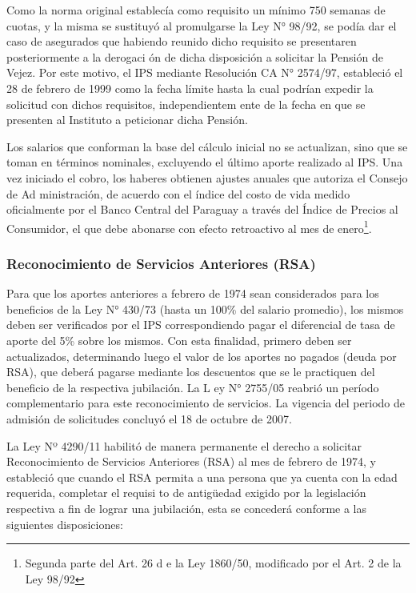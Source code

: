 Como la norma original establecía como requisito un mínimo 750 semanas
de cuotas, y la misma se sustituyó al promulgarse la Ley N° 98/92, se
podía dar el caso de asegurados que habiendo reunido dicho requisito se
presentaren posteriormente a la derogaci ón de dicha disposición a
solicitar la Pensión de Vejez. Por este motivo, el IPS mediante
Resolución CA N° 2574/97, estableció el 28 de febrero de 1999 como la
fecha límite hasta la cual podrían expedir la solicitud con dichos
requisitos, independientem ente de la fecha en que se presenten al
Instituto a peticionar dicha Pensión.

Los salarios que conforman la base del cálculo inicial no se actualizan,
sino que se toman en términos nominales, excluyendo el último aporte
realizado al IPS. Una vez iniciado el cobro, los haberes obtienen
ajustes anuales que autoriza el Consejo de Ad ministración, de acuerdo
con el índice del costo de vida medido oficialmente por el Banco Central
del Paraguay a través del Índice de Precios al Consumidor, el que debe
abonarse con efecto retroactivo al mes de
enero\footnote{Segunda parte del Art. 26 d
e la Ley 1860/50, modificado por el Art. 2 de la Ley 98/92}.

\subsubsection{Reconocimiento de Servicios Anteriores (RSA)}

Para que los aportes anteriores a febrero de 1974 sean considerados para
los beneficios de la Ley N° 430/73 (hasta un 100\% del salario
promedio), los mismos deben ser verificados por el IPS correspondiendo
pagar el diferencial de tasa de aporte del 5\% sobre los mismos. Con
esta finalidad, primero deben ser actualizados, determinando luego el
valor de los aportes no pagados (deuda por RSA), que deberá pagarse
mediante los descuentos que se le practiquen del beneficio de la
respectiva jubilación. La L ey N° 2755/05 reabrió un período
complementario para este reconocimiento de servicios. La vigencia del
periodo de admisión de solicitudes concluyó el 18 de octubre de 2007.

La Ley Nº 4290/11 habilitó de manera permanente el derecho a solicitar
Reconocimiento de Servicios Anteriores (RSA) al mes de febrero de 1974,
y estableció que cuando el RSA permita a una persona que ya cuenta con
la edad requerida, completar el requisi to de antigüedad exigido por la
legislación respectiva a fin de lograr una jubilación, esta se concederá
conforme a las siguientes disposiciones:

